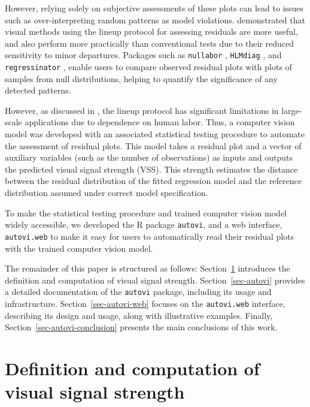 \documentclass[
doublespace,
  times]{anzsauth}
\begin{document}
However, relying solely on subjective assessments of these plots can
lead to issues such as over-interpreting random patterns as model
violations. \citet{li2024plot} demonstrated that visual methods using
the lineup protocol \citep{buja2009statistical} for assessing residuals
are more useful, and also perform more practically than conventional
tests due to their reduced sensitivity to minor departures. Packages
such as \texttt{nullabor} \citep{nullabor}, \texttt{HLMdiag}
\citep{loy2014hlmdiag}, and \texttt{regressinator}
\citep{regressinator}, enable users to compare observed residual plots
with plots of samples from null distributions, helping to quantify the
significance of any detected patterns.

However, as discussed in \citet{li2024automated}, the lineup protocol
has significant limitations in large-scale applications due to
dependence on human labor. Thus, a computer vision model was developed
with an associated statistical testing procedure to automate the
assessment of residual plots. This model takes a residual plot and a
vector of auxiliary variables (such as the number of observations) as
inputs and outputs the predicted visual signal strength (VSS). This
strength estimates the distance between the residual distribution of the
fitted regression model and the reference distribution assumed under
correct model specification.

To make the statistical testing procedure and trained computer vision
model widely accessible, we developed the R package \texttt{autovi}, and
a web interface, \texttt{autovi.web} to make it easy for users to
automatically read their residual plots with the trained computer vision
model.

The remainder of this paper is structured as follows:
Section~\ref{sec-vss-desc} introduces the definition and computation of
visual signal strength. Section~\ref{sec-autovi} provides a detailed
documentation of the \texttt{autovi} package, including its usage and
infrastructure. Section~\ref{sec-autovi-web} focuses on the
\texttt{autovi.web} interface, describing its design and usage, along
with illustrative examples. Finally, Section~\ref{sec-autovi-conclusion}
presents the main conclusions of this work.

\section{Definition and computation of visual signal
strength}\label{sec-vss-desc}
\end{document}
